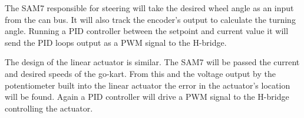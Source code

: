 The SAM7 responsible for steering will take the desired wheel angle as an input from the can bus. It will also track the encoder's output to calculate the turning angle. Running a PID controller between the setpoint and current value it will send the PID loops output as a PWM signal to the H-bridge.

The design of the linear actuator is similar. The SAM7 will be passed the current and desired speeds of the go-kart. From this and the voltage output by the potentiometer built into the linear actuator the error in the actuator's location will be found. Again a PID controller will drive a PWM signal to the H-bridge controlling the actuator.
